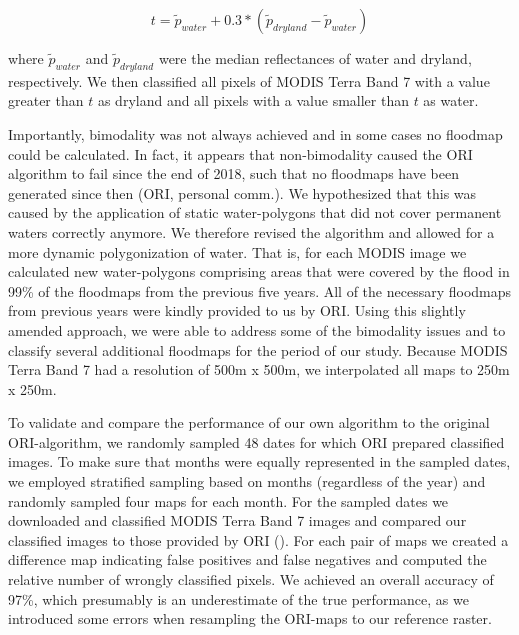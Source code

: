 \documentclass[abstract=on,10pt,a4paper,bibliography=totocnumbered]{scrartcl}
\begin{document}
\begin{equation}
\label{EQ1}
t = \widetilde{p}_{water} + 0.3 * (\widetilde{p}_{dryland} -
\widetilde{p}_{water})
\end{equation}

\noindent where \(\widetilde{p}_{water}\) and \(\widetilde{p}_{dryland}\) were
the median reflectances of water and dryland, respectively. We then classified
all pixels of MODIS Terra Band 7 with a value greater than \(t\) as dryland and
all pixels with a value smaller than \(t\) as water.

Importantly, bimodality was not always achieved and in some cases no floodmap
could be calculated. In fact, it appears that non-bimodality caused the ORI
algorithm to fail since the end of 2018, such that no floodmaps have been
generated since then (ORI, personal comm.). We hypothesized that this was caused
by the application of static water-polygons that did not cover permanent waters
correctly anymore. We therefore revised the algorithm and allowed for a more
dynamic polygonization of water. That is, for each MODIS image we calculated new
water-polygons comprising areas that were covered by the flood in 99\% of the
floodmaps from the previous five years. All of the necessary floodmaps from
previous years were kindly provided to us by ORI. Using this slightly amended
approach, we were able to address some of the bimodality issues and to classify
several additional floodmaps for the period of our study. Because MODIS Terra
Band 7 had a resolution of 500m x 500m, we interpolated all maps to 250m x 250m.

To validate and compare the performance of our own algorithm to the original
ORI-algorithm, we randomly sampled 48 dates for which ORI prepared classified
images. To make sure that months were equally represented in the sampled dates,
we employed stratified sampling based on months (regardless of the year) and
randomly sampled four maps for each month. For the sampled dates we downloaded
and classified MODIS Terra Band 7 images and compared our classified images to
those provided by ORI (). For each pair of maps we
created a difference map indicating false positives and false negatives and
computed the relative number of wrongly classified pixels. We achieved an
overall accuracy of 97\%, which presumably is an underestimate of the true
performance, as we introduced some errors when resampling the ORI-maps to our
reference raster.
\end{document}

